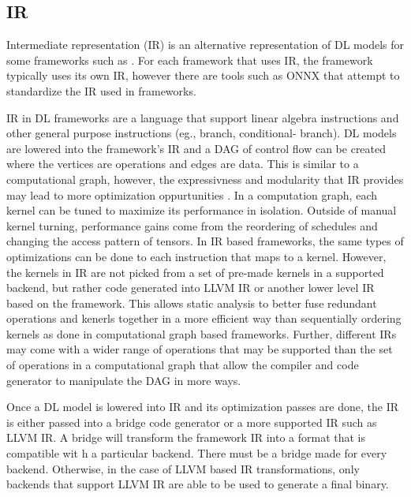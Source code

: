 



\subsection{IR}
Intermediate representation (IR) is an alternative representation of DL models
for some frameworks such as \cite{DLVM} \cite{nGraph} \cite{ONNX}. For each
framework that uses IR, the framework typically uses its own IR, however
there are tools such as ONNX that attempt to standardize the IR used in
frameworks. 

IR in DL frameworks are a language that support linear algebra instructions and
other general purpose instructions (eg., branch, conditional- branch). DL
models are lowered into the framework's IR and a DAG of control flow
\cite{nGraph} can be created where the vertices are operations and edges are
data. This is similar to a computational graph, however, the expressivness and
modularity that IR provides may lead to more optimization oppurtunities
\cite{DLVM}. In a computation graph, each kernel can be tuned to maximize its
performance in isolation. Outside of manual kernel turning, performance gains
come from the reordering of schedules and changing the access pattern of
tensors.  In IR based frameworks, the same types of optimizations can be done
to each instruction that maps to a kernel. However, the kernels in IR are not
picked from a set of pre-made kernels in a supported backend, but rather code
generated into LLVM IR or another lower level IR based on the framework. This
allows static analysis to better fuse redundant operations and kenerls together
in a more efficient way than sequentially ordering kernels as done in
computational graph based frameworks. Further, different IRs may come with
a wider range of operations that may be supported than the set of operations in
a computational graph that allow the compiler and code generator to manipulate
the DAG in more ways.

Once a DL model is lowered into IR and its optimization passes are done, the IR
is either passed into a bridge code generator or a more supported IR such as
LLVM IR. A bridge will transform the framework IR into a format that is
compatible wit h a particular backend. There must be a bridge made for every
backend. Otherwise, in the case of LLVM based IR transformations, only
backends that support LLVM IR are able to be used to generate a final binary.


